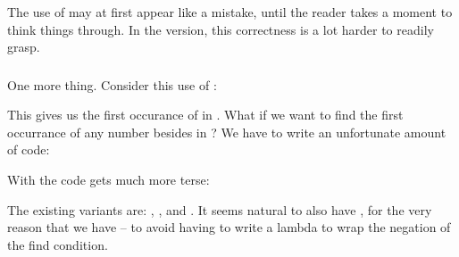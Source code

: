 

The use of  may at first appear like a mistake, until the reader
takes a moment to think things through.  In the 
version, this correctness is a lot harder to readily grasp.

\subsubsection{}

One more thing.  Consider this use of :



This gives us the first occurance of  in .  What if we want
to find the first occurrance of any number besides  in ?  We
have to write an unfortunate amount of code:



With  the code gets much more terse:



The existing  variants are: , , and
.  It seems natural to also have , for
the very reason that we have  -- to avoid having to write
a lambda to wrap the negation of the find condition.
